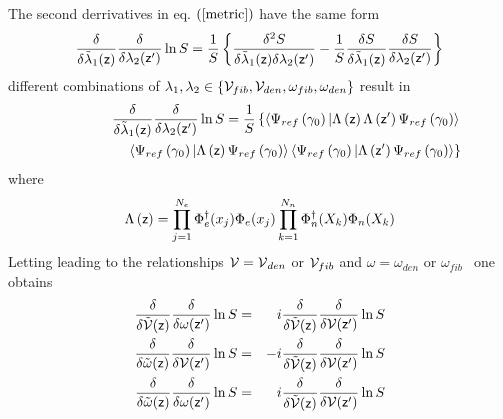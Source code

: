 The second derrivatives in eq. $\left( \ref{metric}\right) $ have the same
form 
\begin{equation}
\frac{\delta }{\delta \tilde{\lambda}_{1}({\sf z})}\frac{\delta }{\delta
\lambda _{2}({\sf z}^{\prime })}\ln S=\frac{1}{S}\left\{ \frac{\delta ^{2}S}{%
\delta \tilde{\lambda}_{1}({\sf z})\delta \lambda _{2}({\sf z}^{\prime })}-%
\frac{1}{S}\frac{\delta S}{\delta \tilde{\lambda}_{1}({\sf z})}\frac{\delta S%
}{\delta \lambda _{2}({\sf z}^{\prime })}\right\}
\end{equation}%
different combinations of $\lambda _{1},\lambda _{2}\in \left\{ {\cal V}%
_{fib},{\cal V}_{den},\omega _{fib},\omega _{den}\right\} $ result in 
\begin{eqnarray}
&&\frac{\delta }{\delta \tilde{\lambda}_{1}({\sf z})}\frac{\delta }{\delta
\lambda _{2}({\sf z}^{\prime })}\ln S=\frac{1}{S}\left\{ \left\langle \Psi
_{ref}\left( \gamma _{0}\right) |\Lambda \left( {\sf z}\right) \Lambda
\left( {\sf z}^{\prime }\right) \Psi _{ref}\left( \gamma _{0}\right)
\right\rangle \right.  \nonumber \\
&&\qquad \qquad \left. \left\langle \Psi _{ref}\left( \gamma _{0}\right)
|\Lambda \left( {\sf z}\right) \Psi _{ref}\left( \gamma _{0}\right)
\right\rangle \left\langle \Psi _{ref}\left( \gamma _{0}\right) |\Lambda
\left( {\sf z}^{\prime }\right) \Psi _{ref}\left( \gamma _{0}\right)
\right\rangle \right\}
\end{eqnarray}%
where%
\begin{equation}
\Lambda \left( {\sf z}\right) =\prod\limits_{j=1}^{N_{e}}\Phi _{e}^{\dagger
}(x_{j})\Phi _{e}(x_{j})\prod\limits_{k=1}^{N_{n}}\Phi _{n}^{\dagger
}(X_{k})\Phi _{n}(X_{k})
\end{equation}%
Letting leading to the relationships ${\cal V=V}_{den}$ or ${\cal V}_{fib}$
and $\omega =\omega _{den}$ or $\omega _{fib\text{ }}$ one obtains 
\begin{eqnarray}
\frac{\delta }{\delta {\cal \tilde{V}}({\sf z})}\frac{\delta }{\delta \omega
({\sf z}^{\prime })}\ln S &=&i\frac{\delta }{\delta {\cal \tilde{V}}({\sf z})%
}\frac{\delta }{\delta {\cal V}({\sf z}^{\prime })}\ln S \\
\frac{\delta }{\delta {\cal \tilde{\omega}}({\sf z})}\frac{\delta }{\delta 
{\cal V}({\sf z}^{\prime })}\ln S &=&-i\frac{\delta }{\delta {\cal \tilde{V}}%
({\sf z})}\frac{\delta }{\delta {\cal V}({\sf z}^{\prime })}\ln S \\
\frac{\delta }{\delta {\cal \tilde{\omega}}({\sf z})}\frac{\delta }{\delta
\omega ({\sf z}^{\prime })}\ln S &=&i\frac{\delta }{\delta {\cal \tilde{V}}(%
{\sf z})}\frac{\delta }{\delta {\cal V}({\sf z}^{\prime })}\ln S
\end{eqnarray}%

